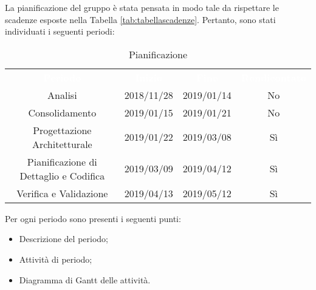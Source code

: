 La pianificazione del gruppo \gruppo \space è stata pensata in modo tale da rispettare le scadenze esposte nella Tabella \ref{tab:tabellascadenze}.\newline
Pertanto, sono stati individuati i seguenti periodi:

\renewcommand{\arraystretch}{1.5}
\begin{table}[H]	
	\begin{center}
	    \begin{tabular}{ c  c  c  c }
	        \rowcolor{greySWEight}
	        \textcolor{white}{\textbf{Periodo}} & \textcolor{white}{\textbf{Inizio}}& \textcolor{white}{\textbf{Fine}}&\textcolor{white}{\textbf{Rendicontato}}\\
	        Analisi & 2018/11/28 & 2019/01/14&No\\
	        Consolidamento & 2019/01/15 & 2019/01/21&No\\
	        Progettazione Architetturale & 2019/01/22 & 2019/03/08&Sì\\
	        Pianificazione di Dettaglio e Codifica & 2019/03/09 & 2019/04/12&Sì\\
	        Verifica e Validazione & 2019/04/13 & 2019/05/12&Sì\\
	    \end{tabular}
	    \caption{Pianificazione} \label{tab:pianificazione} 
	\end{center}
\end{table}


Per ogni periodo sono presenti i seguenti punti:
\begin{itemize}
	\item Descrizione del periodo;
	\item Attività di periodo;
	\item {Diagramma di Gantt} delle attività.
\end{itemize}